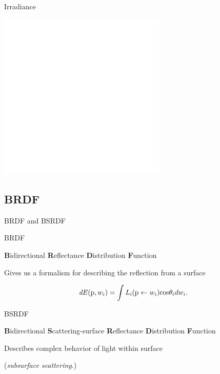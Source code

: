 \documentclass[10pt,compress,professionalfont]{beamer}
\begin{document}
\begin{frame}{Irradiance}

    \centering
    \vspace{-1cm}
    \includegraphics[height=80mm]{../img/diag/radiance.pdf}

\end{frame}




\subsection{BRDF}
\begin{frame}{BRDF and BSRDF}


    \begin{block}{BRDF}
        \begin{center}
            {\bf B}idirectional {\bf R}eflectance {\bf D}istribution {\bf F}unction

            \vspace{3mm}

            Gives us a formalism for describing the reflection from a surface
        \end{center}

        \[
            \mathit{dE}(\textup{p}, w_i) = \int\mathit{L_i}(\textup{p} \leftarrow w_i)\textup{cos}\theta_i dw_i.
        \]
    \end{block}
    
    \begin{block}{BSRDF}
        \begin{center}
            {\bf B}idirectional {\bf S}cattering-surface {\bf R}eflectance {\bf D}istribution {\bf F}unction

            \vspace{3mm}

            Describes complex behavior of light within surface

            (\emph{subsurface scattering}.)
        \end{center}
    \end{block}

\end{frame}
\end{document}
